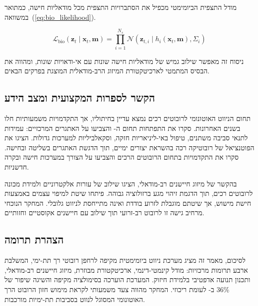 מודל התצפית הביומימטי מכפיל את הסתברויות התצפית מכל מודאליות חישה, כמתואר במשוואה~(\ref{eq:bio_likelihood}).

\begin{equation}
\mathcal{L}_{\text{bio}}(\mathbf{z}_t \mid \mathbf{x}_t, \mathbf{m}) = \prod_{i=1}^{N_s} \mathcal{N}(\mathbf{z}_{t,i} \mid h_i(\mathbf{x}_t, \mathbf{m}), \Sigma_i)
\label{eq:bio_likelihood}
\end{equation}

ניסוח זה מאפשר שילוב גמיש של מודאליות חישה שונות עם אי-ודאויות שונות, ומהווה את הבסיס המתמטי לארכיטקטורת המיזוג הרב-מודאלית המוצגת בפרקים הבאים.

\subsection{הקשר לספרות המקצועית ומצב הידע}
\label{sec:intro_literature}

תחום הניווט האוטונומי לרובוטים רכים נמצא עדיין בחיתוליו, אך התקדמויות משמעותיות חלו בשנים האחרונות. \cite{Cadena2016} סקרו את התפתחות תחום ה- והצביעו על האתגרים המרכזיים: עמידות לתנאי סביבה משתנים, טיפול באי-ליניאריות חזקה, וסקאלביליות למערכות גדולות. \cite{Laschi2016} הציגו את הפוטנציאל של רובוטיקה רכה בהשראת יצורים ימיים, תוך הדגשת האתגרים בשליטה ובחישה. \cite{Rus2015} סקרו את התקדמויות בתחום הרובוטים הרכים והצביעו על הצורך במערכות חישה ובקרה חדשניות.

בהקשר של מיזוג חיישנים רב-מודאלי, \cite{Shih2020} הציגו שילוב של עורות אלקטרוניים ולמידת מכונה לרובוטים רכים, תוך הדגמת זיהוי מגע ברזולוציה גבוהה. \cite{Luo2022} פיתחו שיטת  למיפוי עצמים באמצעות חישת מישוש, אך שיטתם מוגבלת לזרוע בודדת ואינה מתייחסת לניווט גלובלי. המחקר הנוכחי מרחיב גישה זו לרובוט רב-זרועי תוך שילוב עם חיישנים אקוסטיים וחזותיים.

\subsection{הצהרת תרומה}
\label{sec:intro_statement}

לסיכום, מאמר זה מציג מערכת ניווט ביומימטית מקיפה לרחפן רובוטי רך תת-ימי, המשלבת ארבע תרומות מרכזיות: מודל קינמטי-דינמי, ארכיטקטורת  מבוזרת, מיזוג חיישנים רב-מודאלי, ותכנון תנועה אדפטיבי בלמידת חיזוק. המערכת הוערכה בסימולציה מקיפה והשיגה שיפור של 36\% ב- לעומת  ריכוזי. המחקר מהווה צעד משמעותי לקראת מימוש חזון הרובוט הרך האוטונומי המסוגל לנווט בסביבות תת-ימיות מורכבות.

